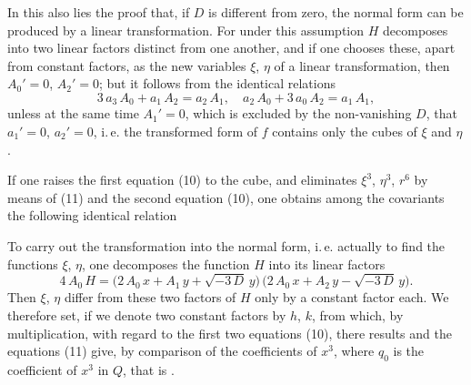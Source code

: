 In this also lies the proof that, if $D$ is different from zero, the normal form can be produced by a linear transformation. For under this assumption $H$ decomposes into two linear factors distinct from one another, and if one chooses these, apart from constant factors, as the new variables $\xi$, $\eta$ of a linear transformation, then $A_0' = 0$, $A_2' = 0$; but it follows from the identical relations
\[
3\,a_3\,A_0 + a_1\,A_2 = a_2\,A_1,\quad a_2\,A_0 + 3\,a_0\,A_2 = a_1\,A_1,
\]
unless at the same time $A_1' = 0$, which is excluded by the non-vanishing $D$, that $a_1' = 0$, $a_2' = 0$, i.\,e. the transformed form of $f$ contains only the cubes of $\xi$ and $\eta$.

If one raises the first equation (10) to the cube, and eliminates $\xi^3$, $\eta^3$, $r^6$ by means of (11) and the second equation (10), one obtains among the covariants the following identical relation

To carry out the transformation into the normal form, i.\,e. actually to find the functions $\xi$, $\eta$, one decomposes the function $H$ into its linear factors
\[
4\,A_0\,H = \bigl(2\,A_0\,x + A_1\,y + \sqrt{-3\,D}\,y\bigr)\,\bigl(2\,A_0\,x + A_2\,y - \sqrt{-3\,D}\,y\bigr).
\]
Then $\xi$, $\eta$ differ from these two factors of $H$ only by a constant factor each. We therefore set, if we denote two constant factors by $h$, $k$,
from which, by multiplication, with regard to the first two equations (10), there results
and the equations (11) give, by comparison of the coefficients of $x^3$,
where $q_0$ is the coefficient of $x^3$ in $Q$, that is
.
